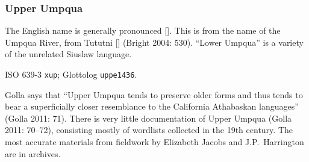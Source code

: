 \documentclass[12pt,letterpaper,oneside,article]{memoir}
\begin{document}
\subsubsection{Upper Umpqua}\label{sec:umpqua}

The English name  is generally pronounced [].
This is from the name of the Umpqua River, from Tututni  [] (Bright 2004: 530).
“Lower Umpqua” is a variety of the unrelated Siuslaw language.

ISO 639-3 \texttt{xup}; Glottolog \texttt{uppe1436}.

Golla says that “Upper Umpqua tends to preserve older forms and thus tends to bear a superficially closer resemblance to the California Athabaskan languages” (Golla 2011: 71).
There is very little documentation of Upper Umpqua (Golla 2011: 70–72), consisting mostly of wordlists collected in the 19th century.
The most accurate materials from fieldwork by Elizabeth Jacobs and J.P.\ Harrington are in archives.
\end{document}
